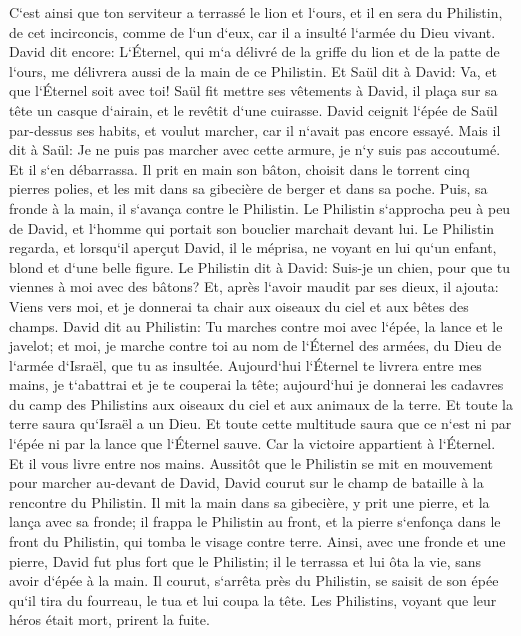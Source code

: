 \verse C`est ainsi que ton serviteur a terrassé le lion et l`ours, et il en sera du Philistin, de cet incirconcis, comme de l`un d`eux, car il a insulté l`armée du Dieu vivant. 
\verse David dit encore: L`Éternel, qui m`a délivré de la griffe du lion et de la patte de l`ours, me délivrera aussi de la main de ce Philistin. Et Saül dit à David: Va, et que l`Éternel soit avec toi! 
\verse Saül fit mettre ses vêtements à David, il plaça sur sa tête un casque d`airain, et le revêtit d`une cuirasse. 
\verse David ceignit l`épée de Saül par-dessus ses habits, et voulut marcher, car il n`avait pas encore essayé. Mais il dit à Saül: Je ne puis pas marcher avec cette armure, je n`y suis pas accoutumé. Et il s`en débarrassa. 
\verse Il prit en main son bâton, choisit dans le torrent cinq pierres polies, et les mit dans sa gibecière de berger et dans sa poche. Puis, sa fronde à la main, il s`avança contre le Philistin. 
\verse Le Philistin s`approcha peu à peu de David, et l`homme qui portait son bouclier marchait devant lui. 
\verse Le Philistin regarda, et lorsqu`il aperçut David, il le méprisa, ne voyant en lui qu`un enfant, blond et d`une belle figure. 
\verse Le Philistin dit à David: Suis-je un chien, pour que tu viennes à moi avec des bâtons? Et, après l`avoir maudit par ses dieux, 
\verse il ajouta: Viens vers moi, et je donnerai ta chair aux oiseaux du ciel et aux bêtes des champs. 
\verse David dit au Philistin: Tu marches contre moi avec l`épée, la lance et le javelot; et moi, je marche contre toi au nom de l`Éternel des armées, du Dieu de l`armée d`Israël, que tu as insultée. 
\verse Aujourd`hui l`Éternel te livrera entre mes mains, je t`abattrai et je te couperai la tête; aujourd`hui je donnerai les cadavres du camp des Philistins aux oiseaux du ciel et aux animaux de la terre. Et toute la terre saura qu`Israël a un Dieu. 
\verse Et toute cette multitude saura que ce n`est ni par l`épée ni par la lance que l`Éternel sauve. Car la victoire appartient à l`Éternel. Et il vous livre entre nos mains. 
\verse Aussitôt que le Philistin se mit en mouvement pour marcher au-devant de David, David courut sur le champ de bataille à la rencontre du Philistin. 
\verse Il mit la main dans sa gibecière, y prit une pierre, et la lança avec sa fronde; il frappa le Philistin au front, et la pierre s`enfonça dans le front du Philistin, qui tomba le visage contre terre. 
\verse Ainsi, avec une fronde et une pierre, David fut plus fort que le Philistin; il le terrassa et lui ôta la vie, sans avoir d`épée à la main. 
\verse Il courut, s`arrêta près du Philistin, se saisit de son épée qu`il tira du fourreau, le tua et lui coupa la tête. Les Philistins, voyant que leur héros était mort, prirent la fuite. 
